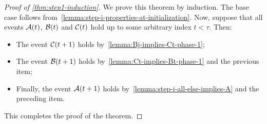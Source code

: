 \begin{proof}[Proof of \cref{thm:step1-induction}]
We prove this theorem by induction. The base case follows from~\cref{lemma:step-i-properties-at-initialization}.
Now, suppose that all events $\mathcal{A}(t)$, $\mathcal{B}(t)$ and $\mathcal{C}(t)$ hold up to some arbitrary index $t < \tau$. Then:
\begin{itemize}
  \item The event $\mathcal{C}(t+1)$ holds by~\cref{lemma:Bj-implies-Ct-phase-1};
  \item The event $\mathcal{B}(t+1)$ holds by~\cref{lemma:Ct-implies-Bt-phase-1} and the previous item;
  \item Finally, the event $\mathcal{A}(t+1)$ holds by~\cref{lemma:step-i-all-else-implies-A} and the preceding item.
\end{itemize}
This completes the proof of the theorem.
\end{proof}


